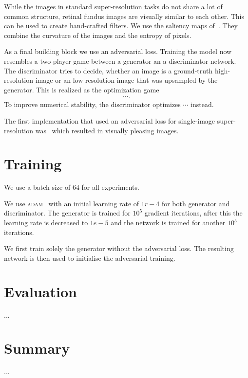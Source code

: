 \documentclass{scrartcl}
\begin{document}
While the images in standard super-resolution tasks do not share a lot of common structure, retinal fundus images are visually similar to each other.
This can be used to create hand-crafted filters.
We use the saliency maps of~\cite{SaliencyGAN}.
They combine the curvature of the images and the entropy of pixels.

As a final building block we use an adversarial loss.
Training the model now resembles a two-player game between a generator an a discriminator network.
The discriminator tries to decide, whether an image is a ground-truth high-resolution image or an low resolution image that was upsampled by the generator.
This is realized as the optimization game
\begin{align}
  \cdots.
\end{align}
To improve numerical stability, the discriminator optimizes \(\cdots\) instead.

The first implementation that used an adversarial loss for single-image super-resolution was~\cite{SRGAN} which resulted in visually pleasing images.

\section{Training}
We use a batch size of $64$ for all experiments.

We use \textsc{adam}\  with an initial learning rate of $1r-4$ for both generator and discriminator.
The generator is trained for $10^5$ gradient iterations, after this the learning rate is decreased to $1e-5$ and the network is trained for another $10^5$ iterations.

We first train solely the generator without the adversarial loss.
The resulting network is then used to initialise the adversarial training.



\section{Evaluation}
...

\section{Summary}
...

\printbibliography
\end{document}

